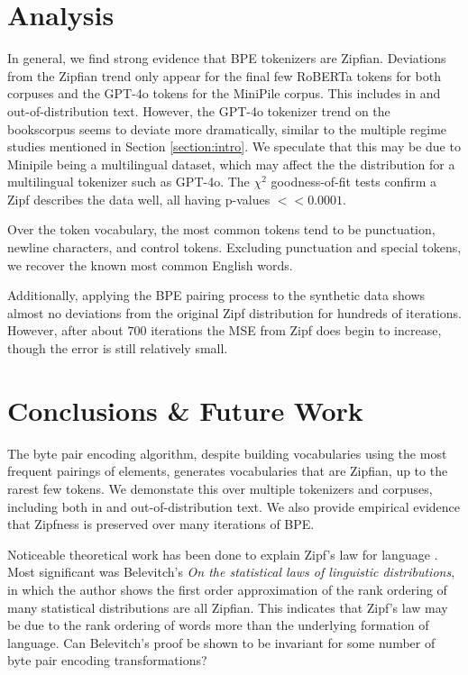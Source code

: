 \documentclass[11pt]{article}
\begin{document}
\section{Analysis}

In general, we find strong evidence that BPE tokenizers are Zipfian. Deviations from the Zipfian trend only appear for the final few RoBERTa tokens for both corpuses and the GPT-4o tokens for the MiniPile corpus. This includes in and out-of-distribution text. However, the GPT-4o tokenizer trend on the bookscorpus seems to deviate more dramatically, similar to the multiple regime studies mentioned in Section \ref{section:intro}. We speculate that this may be due to Minipile being a multilingual dataset, which may affect the the distribution for a multilingual tokenizer such as GPT-4o. The $\chi^2$ goodness-of-fit tests confirm a Zipf describes the data well, all having p-values $<<0.0001$. 

Over the token vocabulary, the most common tokens tend to be punctuation, newline characters, and control tokens. Excluding punctuation and special tokens, we recover the known most common English words.

Additionally, applying the BPE pairing process to the synthetic data shows almost no deviations from the original Zipf distribution for hundreds of iterations. However, after about $700$ iterations the MSE from Zipf does begin to increase, though the error is still relatively small.

\section{Conclusions \& Future Work}

The byte pair encoding algorithm, despite building vocabularies using the most frequent pairings of elements, generates vocabularies that are Zipfian, up to the rarest few tokens. We demonstate this over multiple tokenizers and corpuses, including both in and out-of-distribution text. We also provide empirical evidence that Zipfness is preserved over many iterations of BPE.

Noticeable theoretical work has been done to explain Zipf's law for language \cite{li1992}. Most significant was Belevitch's \textit{On the statistical laws of linguistic distributions}\cite{Belevitch1959}, in which the author shows the first order approximation of the rank ordering of many statistical distributions are all Zipfian. This indicates that Zipf's law may be due to the rank ordering of words more than the underlying formation of language. Can Belevitch's proof be shown to be invariant for some number of byte pair encoding transformations?

%




\end{document}
